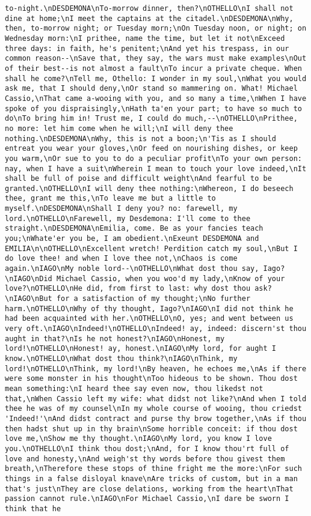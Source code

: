 \begin{verbatim}
to-night.\nDESDEMONA\nTo-morrow dinner, then?\nOTHELLO\nI shall not dine at home;\nI meet the captains at the citadel.\nDESDEMONA\nWhy, then, to-morrow night; or Tuesday morn;\nOn Tuesday noon, or night; on Wednesday morn:\nI prithee, name the time, but let it not\nExceed three days: in faith, he's penitent;\nAnd yet his trespass, in our common reason--\nSave that, they say, the wars must make examples\nOut of their best--is not almost a fault\nTo incur a private cheque. When shall he come?\nTell me, Othello: I wonder in my soul,\nWhat you would ask me, that I should deny,\nOr stand so mammering on. What! Michael Cassio,\nThat came a-wooing with you, and so many a time,\nWhen I have spoke of you dispraisingly,\nHath ta'en your part; to have so much to do\nTo bring him in! Trust me, I could do much,--\nOTHELLO\nPrithee, no more: let him come when he will;\nI will deny thee nothing.\nDESDEMONA\nWhy, this is not a boon;\n'Tis as I should entreat you wear your gloves,\nOr feed on nourishing dishes, or keep you warm,\nOr sue to you to do a peculiar profit\nTo your own person: nay, when I have a suit\nWherein I mean to touch your love indeed,\nIt shall be full of poise and difficult weight\nAnd fearful to be granted.\nOTHELLO\nI will deny thee nothing:\nWhereon, I do beseech thee, grant me this,\nTo leave me but a little to myself.\nDESDEMONA\nShall I deny you? no: farewell, my lord.\nOTHELLO\nFarewell, my Desdemona: I'll come to thee straight.\nDESDEMONA\nEmilia, come. Be as your fancies teach you;\nWhate'er you be, I am obedient.\nExeunt DESDEMONA and EMILIA\n\nOTHELLO\nExcellent wretch! Perdition catch my soul,\nBut I do love thee! and when I love thee not,\nChaos is come again.\nIAGO\nMy noble lord--\nOTHELLO\nWhat dost thou say, Iago?\nIAGO\nDid Michael Cassio, when you woo'd my lady,\nKnow of your love?\nOTHELLO\nHe did, from first to last: why dost thou ask?\nIAGO\nBut for a satisfaction of my thought;\nNo further harm.\nOTHELLO\nWhy of thy thought, Iago?\nIAGO\nI did not think he had been acquainted with her.\nOTHELLO\nO, yes; and went between us very oft.\nIAGO\nIndeed!\nOTHELLO\nIndeed! ay, indeed: discern'st thou aught in that?\nIs he not honest?\nIAGO\nHonest, my lord!\nOTHELLO\nHonest! ay, honest.\nIAGO\nMy lord, for aught I know.\nOTHELLO\nWhat dost thou think?\nIAGO\nThink, my lord!\nOTHELLO\nThink, my lord!\nBy heaven, he echoes me,\nAs if there were some monster in his thought\nToo hideous to be shown. Thou dost mean something:\nI heard thee say even now, thou likedst not that,\nWhen Cassio left my wife: what didst not like?\nAnd when I told thee he was of my counsel\nIn my whole course of wooing, thou criedst 'Indeed!'\nAnd didst contract and purse thy brow together,\nAs if thou then hadst shut up in thy brain\nSome horrible conceit: if thou dost love me,\nShow me thy thought.\nIAGO\nMy lord, you know I love you.\nOTHELLO\nI think thou dost;\nAnd, for I know thou'rt full of love and honesty,\nAnd weigh'st thy words before thou givest them breath,\nTherefore these stops of thine fright me the more:\nFor such things in a false disloyal knave\nAre tricks of custom, but in a man that's just\nThey are close delations, working from the heart\nThat passion cannot rule.\nIAGO\nFor Michael Cassio,\nI dare be sworn I think that he 
\end{verbatim}
